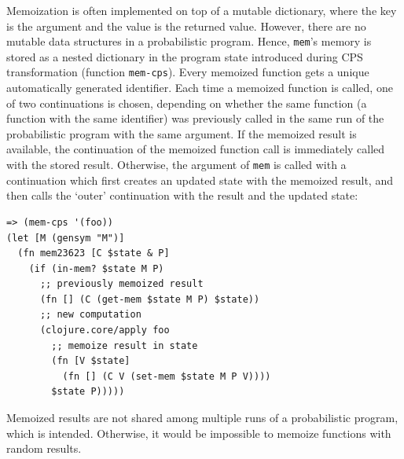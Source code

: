 \documentclass[preprint]{sigplanconf}
\begin{document}
Memoization is often implemented on top of a mutable
dictionary, where the key is the argument  and the value is
the returned value. However, there are no mutable data
structures in a probabilistic program. Hence, \texttt{mem}'s
memory is stored as a nested dictionary in the program state
introduced during CPS transformation (function \texttt{mem-cps}).  
Every memoized function gets a
unique automatically generated identifier. Each time a memoized
function is called, one of two continuations is chosen,
depending on whether the same function (a function with the same
identifier) was previously called in the same run of the
probabilistic program with the same argument. If the memoized
result is available, the continuation of the memoized function
call is immediately called with the stored result. Otherwise,
the argument of \texttt{mem} is called with a continuation which
first creates an updated state with the memoized result, and
then calls the `outer' continuation with the result and the
updated state:
\begin{lstlisting}[style=default]
=> (mem-cps '(foo))
(let [M (gensym "M")]
  (fn mem23623 [C $state & P]
    (if (in-mem? $state M P)
      ;; previously memoized result
      (fn [] (C (get-mem $state M P) $state))
      ;; new computation
      (clojure.core/apply foo
        ;; memoize result in state
        (fn [V $state]
          (fn [] (C V (set-mem $state M P V))))
        $state P)))))
\end{lstlisting}

Memoized results are not shared among multiple runs of a
probabilistic program, which is intended. Otherwise, it would be
impossible to memoize functions with random results. 

\iftoggle{full}{\subsubsection{Continuations}}{\subsection{Managing stack size}}
\label{seq:continuations}
\end{document}
